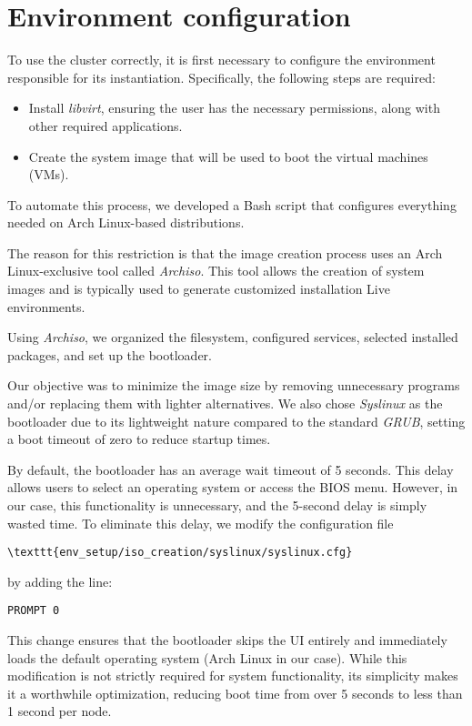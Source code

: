 \section{Environment configuration}
To use the cluster correctly, it is first necessary to configure the 
environment responsible for its instantiation. Specifically, the following
steps are required:
\begin{itemize}
	\item Install \textit{libvirt}, ensuring the user has the necessary permissions,
    along with other required applications.
	\item Create the system image that will be used to boot the virtual
    machines (VMs).
\end{itemize}
To automate this process, we developed a Bash script that configures 
everything needed on Arch Linux-based distributions.

The reason for this restriction is that the image creation process uses 
an Arch Linux-exclusive tool called \textit{Archiso}\cite{4}. 
This tool allows the creation of system images and is typically used 
to generate customized installation Live environments.

Using \textit{Archiso}, we organized the filesystem, configured services, selected 
installed packages, and set up the bootloader.

Our objective was to minimize the image size by removing unnecessary programs 
and/or replacing them with lighter alternatives. We also chose \textit{Syslinux} 
as the bootloader due to its lightweight nature compared to the standard 
\textit{GRUB}, setting a boot timeout of zero to reduce startup times.

By default, the bootloader has an average wait timeout of 5 seconds.
This delay allows users to select an operating system or access the BIOS menu.
However, in our case, this functionality is unnecessary, and the 5-second delay is 
simply wasted time.
To eliminate this delay, we modify the configuration file 
\begin{verbatim}
\texttt{env_setup/iso_creation/syslinux/syslinux.cfg}
\end{verbatim}
by adding the line:
\begin{verbatim}
PROMPT 0
\end{verbatim}
This change ensures that the bootloader skips the UI entirely and immediately loads the default 
operating system (Arch Linux in our case).
While this modification is not strictly required for system functionality, 
its simplicity makes it a worthwhile optimization, reducing boot time from over 5 seconds to 
less than 1 second per node.


